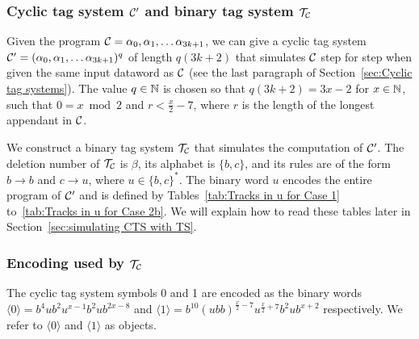 \documentclass[11pt]{article} \usepackage{amsfonts,amsmath,amssymb,amsthm}
\newcommand{\tne}[1]{\ensuremath{\langle #1\rangle}}
\newcommand{\encodeOne}{\tne{1}}
\newcommand{\encodeOneSequence}{\ensuremath{b^{10}(ubb)^{\frac{x}{2}-7}u^{\frac{x}{2}+7}b^{2}ub^{x+2}}}
\newcommand{\encodeZero}{\tne{0}}
\newcommand{\encodeZeroSequence}{\ensuremath{b^4ub^2u^{x-1}b^2ub^{2x-8}}}
\begin{document}
\subsubsection{Cyclic tag system $\mathcal{C'}$ and binary tag system $\mathcal{T_{\mathcal{C}}}$}\label{sec:Cyclic tag system C'}
Given the program $\mathcal{C}=\alpha_0,\alpha_1,\ldots\alpha_{3k+1}$, we can give a cyclic tag system $\mathcal{C'}=(\alpha_0,\alpha_1,\ldots\alpha_{3k+1})^{q}$ of length $q(3k+2)$ that simulates $\mathcal{C}$ step for step when given the same input dataword as $\mathcal{C}$ (see the last paragraph of Section~\ref{sec:Cyclic tag systems}). 
The value $q\in\mathbb{N}$ is chosen so that $q(3k+2)=3x-2$ for $x\in\mathbb{N}$, such that $0=x\bmod2$ and $r<\frac{x}{2}-7$, where $r$ is the length of the longest appendant in $\mathcal{C}$. 

We construct a binary tag system $\mathcal{T_{\mathcal{C}}}$ that simulates the computation of $\mathcal{C'}$. The deletion number of $\mathcal{T_{\mathcal{C}}}$ is $\beta$, its alphabet is $\{b,c\}$, and its rules are of the form $b\rightarrow b$ and $c\rightarrow u$, where $u\in\{b,c\}^\ast$. The binary word $u$ encodes the entire program of $\mathcal{C'}$ and is defined by Tables~\ref{tab:Tracks in u for Case 1} to~\ref{tab:Tracks in u for Case 2b}. We will explain how to read these tables later in Section~\ref{sec:simulating CTS with TS}.




\subsubsection{Encoding used by $\mathcal{T_{\mathcal{C}}}$}\label{sec:Encoding used by tag system}
The cyclic tag system symbols 0 and 1 are encoded as the binary words $\encodeZero=\encodeZeroSequence$ and $\encodeOne=\encodeOneSequence$ respectively. We refer to $\encodeZero$ and $\encodeOne$ as objects.
\end{document}
